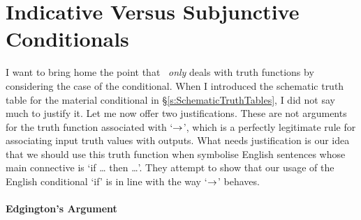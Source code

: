 \section{Indicative Versus Subjunctive Conditionals}\label{s:IndicativeSubjunctive}
I want to bring home the point that \TFL\ \emph{only} deals with truth functions by considering the case of the conditional. When I introduced the schematic truth table for the material conditional in §\ref{s:SchematicTruthTables}, I did not say much to justify it. Let me now offer two justifications. These are not arguments for the truth function associated with `$\rightarrow$', which is a perfectly legitimate rule for associating input truth values with outputs. What needs justification is our idea that we should use this truth function when symbolise English sentences whose main connective is `if … then …'. They attempt to show that our usage of the English conditional `if' is in line with the way `$\rightarrow$' behaves.

\paragraph{Edgington's Argument}

